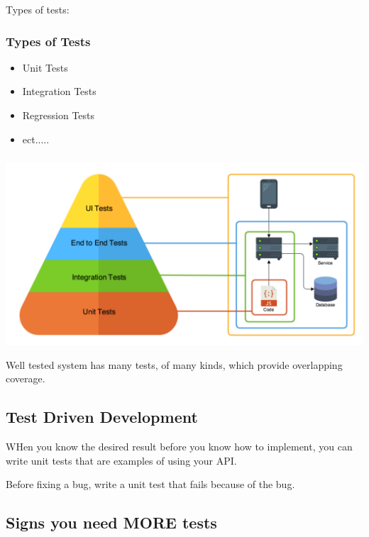 \documentclass{article}
\begin{document}
Types of tests:
\begin{multicols}{2}
    \subsubsection*{Types of Tests}
        \begin{itemize}
            \item Unit Tests
            \item Integration Tests
            \item Regression Tests
            \item ect.....
        \end{itemize}
    \subsubsection*{}
        \vspace*{1em}
        \includegraphics*[width=\linewidth]{testTypes.png}
\end{multicols}

Well tested system has many tests, of many kinds, which provide overlapping coverage.

\subsection{Test Driven Development}
WHen you know the desired result before you know how to implement, you can write unit tests that are examples of using your API.

\vspace*{1em}

Before fixing a bug, write a unit test that fails because of the bug.

\subsection{Signs you need MORE tests}
\end{document}
